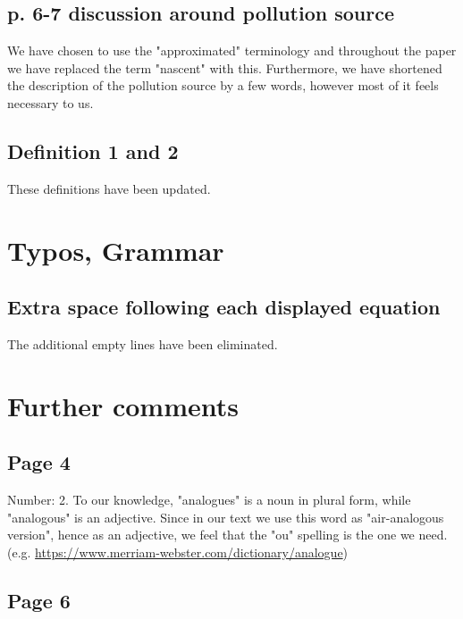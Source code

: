 \documentclass[11pt]{article}
\begin{document}
\subsection{p. 6-7 discussion around pollution source}

We have chosen to use the "approximated" terminology and throughout the paper we have replaced the term "nascent" with this. Furthermore, we have shortened the description of the pollution source by a few words, however most of it feels necessary to us.

\subsection{Definition 1 and 2}

These definitions have been updated.

\section{Typos, Grammar}

\subsection{Extra space following each displayed equation}

The additional empty lines have been eliminated.

\section{Further comments}

\subsection{Page 4}
Number: 2. To our knowledge, "analogues" is a noun in plural form, while "analogous" is an adjective. Since in our text we use this word as "air-analogous version", hence as an adjective, we feel that the "ou" spelling is the one we need. (e.g. \href{https://www.merriam-webster.com/dictionary/analogue}{https://www.merriam-webster.com/dictionary/analogue})

\subsection{Page 6}
\end{document}
